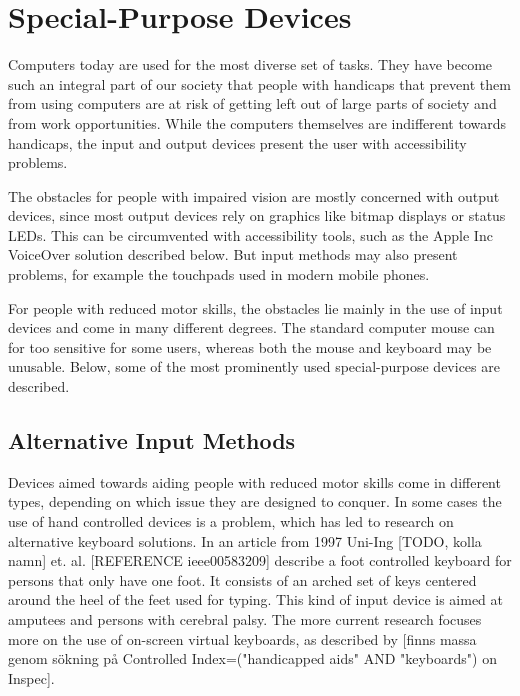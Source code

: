\section{Special-Purpose Devices}

Computers today are used for the most diverse set of tasks. They have become such an integral part of our society that people with handicaps that prevent them from using computers are at risk of getting left out of large parts of society and from work opportunities. While the computers themselves are indifferent towards handicaps, the input and output devices present the user with accessibility problems.

The obstacles for people with impaired vision are mostly concerned with output devices, since most output devices rely on graphics like bitmap displays or status LEDs. This can be circumvented with accessibility tools, such as the Apple Inc VoiceOver solution described below. But input methods may also present problems, for example the touchpads used in modern mobile phones.

For people with reduced motor skills, the obstacles lie mainly in the use of input devices and come in many different degrees. The standard computer mouse  can for too sensitive for some users, whereas both the mouse and keyboard may be unusable. Below, some of the most prominently used special-purpose devices are described.


\subsection{Alternative Input Methods}
Devices aimed towards aiding people with reduced motor skills come in different types, depending on which issue they are designed to conquer. In some cases the use of hand controlled devices is a problem, which has led to research on alternative keyboard solutions. In an article from 1997 Uni-Ing [TODO, kolla namn] et. al. [REFERENCE ieee00583209] describe a foot controlled keyboard for persons that only have one foot. It consists of an arched set of keys centered around the heel of the feet used for typing. This kind of input device is aimed at amputees and persons with cerebral palsy. The more current research focuses more on the use of on-screen virtual keyboards, as described by [finns massa genom sökning på Controlled Index=("handicapped aids" AND "keyboards") on Inspec]. 

